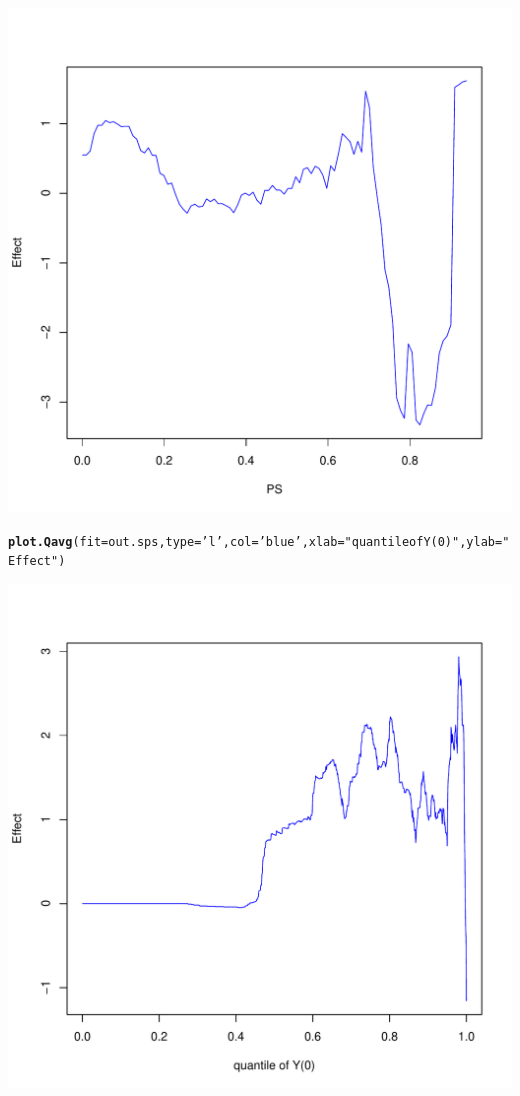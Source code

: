 \documentclass{article}\usepackage[]{graphicx}\usepackage[]{color}
\makeatletter
\def\maxwidth{ %
  \ifdim\Gin@nat@width>\linewidth
    \linewidth
  \else
    \Gin@nat@width
  \fi
}
\newcommand{\hlstr}[1]{\textcolor[rgb]{0.192,0.494,0.8}{#1}}%
\newcommand{\hlstd}[1]{\textcolor[rgb]{0.345,0.345,0.345}{#1}}%
\newcommand{\hlkwc}[1]{\textcolor[rgb]{0.333,0.667,0.333}{#1}}%
\newcommand{\hlkwd}[1]{\textcolor[rgb]{0.737,0.353,0.396}{\textbf{#1}}}%
\newenvironment{kframe}{%
 \def\at@end@of@kframe{}%
 \ifinner\ifhmode%
  \def\at@end@of@kframe{\end{minipage}}%
  \begin{minipage}{\columnwidth}%
 \fi\fi%
 \def\FrameCommand##1{\hskip\@totalleftmargin \hskip-\fboxsep
 \colorbox{shadecolor}{##1}\hskip-\fboxsep
     \hskip-\linewidth \hskip-\@totalleftmargin \hskip\columnwidth}%
 \MakeFramed {\advance\hsize-\width
   \@totalleftmargin\z@ \linewidth\hsize
   \@setminipage}}%
 {\par\unskip\endMakeFramed%
 \at@end@of@kframe}
\newenvironment{knitrout}{}{} %
\makeatother
\begin{document}
\begin{knitrout}
{\centering \includegraphics[width=\maxwidth]{figures/SPS-heatmap-2} 

}


\begin{kframe}\begin{alltt}
\hlkwd{plot.Qavg}\hlstd{(}\hlkwc{fit}\hlstd{=out.sps  ,} \hlkwc{type}\hlstd{=}\hlstr{'l'} \hlstd{,} \hlkwc{col}\hlstd{=}\hlstr{'blue'} \hlstd{,} \hlkwc{xlab}\hlstd{=}\hlstr{"quantile of Y(0)"} \hlstd{,} \hlkwc{ylab}\hlstd{=}\hlstr{"Effect"}\hlstd{)}
\end{alltt}
\end{kframe}

{\centering \includegraphics[width=\maxwidth]{figures/SPS-heatmap-3} 

}



\end{knitrout}
\end{document}
